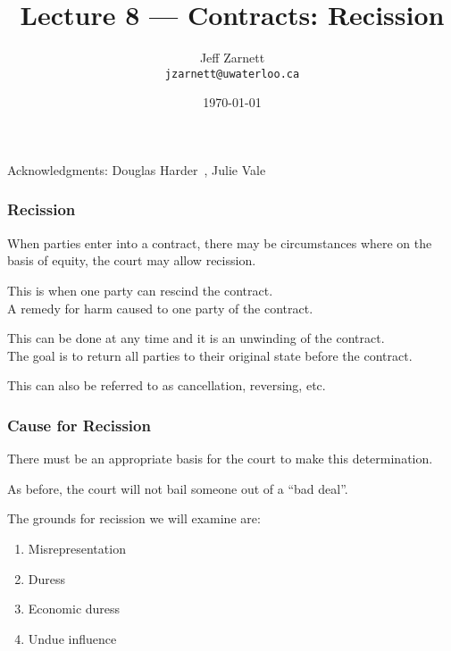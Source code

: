 

\title{Lecture 8 --- Contracts: Recission }

\author{Jeff Zarnett \\ \small \texttt{jzarnett@uwaterloo.ca}}
\date{\today}




\begin{frame}
  \titlepage

\begin{center}
  \small{Acknowledgments: Douglas Harder~\cite{dwh}, Julie Vale~\cite{jv}}
  \end{center}
\end{frame}



\begin{frame}
\frametitle{Recission}

When parties enter into a contract, there may be circumstances where on the basis of equity, the court may allow \alert{recission}.

This is when one party can rescind the contract.\\
\quad A remedy for harm caused to one party of the contract.

This can be done at any time and it is an \alert{unwinding} of the contract.\\
\quad The goal is to return all parties to their original state before the contract.

This can also be referred to as cancellation, reversing, etc.

\end{frame}



\begin{frame}
\frametitle{Cause for Recission}

There must be an appropriate basis for the court to make this determination.

As before, the court will not bail someone out of a ``bad deal''.

The grounds for recission we will examine are:

\begin{enumerate}
	\item Misrepresentation
	\item Duress
	\item Economic duress
	\item Undue influence
\end{enumerate}

\end{frame}



